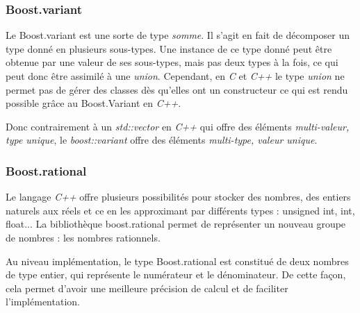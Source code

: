 \subsubsection*{Boost.variant}

Le Boost.variant est une sorte de type \textit{somme}. Il s'agit en fait de décomposer un type donné en plusieurs sous-types. Une instance de ce type donné peut être obtenue par une valeur de ses sous-types, mais pas deux types à la fois, ce qui peut donc  être assimilé à une \textit{union}. Cependant, en \textit{C} et \textit{C++} le type \textit{union} ne permet pas de gérer des classes dès qu'elles ont un constructeur ce qui est rendu possible grâce au Boost.Variant en \textit{C++}.

Donc contrairement à un \textit{std::vector} en \textit{C++} qui offre des éléments \textit{multi-valeur, type unique}, le \textit{boost::variant} offre des éléments \textit{multi-type, valeur unique}.


\subsubsection*{Boost.rational}

Le langage \textit{C++} offre plusieurs possibilités pour stocker des nombres, des entiers naturels aux réels et ce en les approximant par différents types : unsigned int, int, float... La bibliothèque boost.rational permet de représenter un nouveau groupe de nombres : les nombres rationnels.

Au niveau implémentation, le type Boost.rational est constitué de deux nombres de type entier, qui représente le numérateur et le dénominateur. De cette façon, cela permet d'avoir une meilleure précision de calcul et de faciliter l'implémentation.


